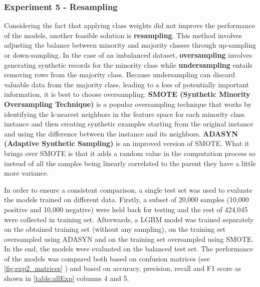 \documentclass[runningheads]{llncs}
\begin{document}
\subsubsection{Experiment 5 - Resampling}

Considering the fact that applying class weights did not improve the performance of the models, another feasible solution is \textbf{resampling}.
This method involves adjusting the balance between minority and majority classes through up-sampling or down-sampling. In the case of an imbalanced dataset, \textbf{oversampling} involves generating synthetic records for the minority class while \textbf{undersampling} entails removing rows from the majority class. 
Because undersampling can discard valuable data from the majority class, leading to a loss of potentially important information, it is best to choose oversampling. 
\textbf{SMOTE (Synthetic Minority Oversampling Technique)} 
\cite{smote2019}
is a popular oversampling technique that works by identifying the k-nearest neighbors in the feature space for each minority class instance and then creating synthetic examples starting from the original instance and using the difference between the instance and its neighbors. 
\textbf{ADASYN (Adaptive Synthetic Sampling)} 
\cite{adasyn2008}
is an improved version of SMOTE. What it brings over SMOTE is that it adds a random value in the computation process so instead of all the samples being linearly correlated to the parent they have a little more variance. 

In order to ensure a consistent comparison, a single test set was used to evaluate the models trained on different data. Firstly, a subset of 20,000 samples (10,000 positive and 10,000 negative) were held back for testing and the rest of 424,045 were collected in training set. Afterwards, a LGBM model was trained separately on the obtained training set (without any sampling), on the training set oversampled using ADASYN and on the training set oversampled using SMOTE. In the end, the models were evaluated on the balanced test set. The performance of the models was compared both based on confusion matrices (see \autoref{fig:exp2_matrices} ) and based on accuracy, precision, recall and F1 score as shown in \autoref{table:allExp} columns 4 and 5. 
\end{document}
